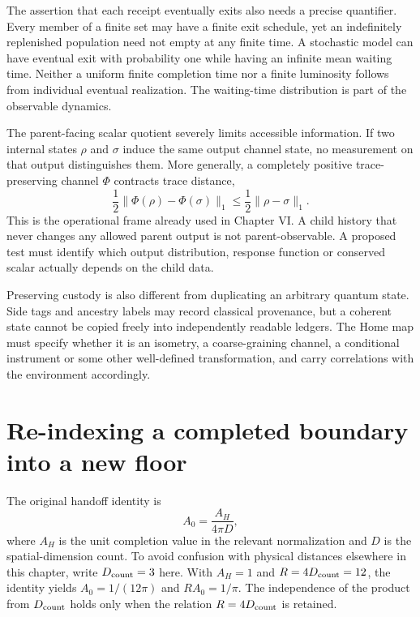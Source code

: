The assertion that each receipt eventually exits also needs a precise quantifier. Every member of a finite set may have a finite exit schedule, yet an indefinitely replenished population need not empty at any finite time. A stochastic model can have eventual exit with probability one while having an infinite mean waiting time. Neither a uniform finite completion time nor a finite luminosity follows from individual eventual realization. The waiting-time distribution is part of the observable dynamics.

The parent-facing scalar quotient severely limits accessible information. If two internal states $\rho$ and $\sigma$ induce the same output channel state, no measurement on that output distinguishes them. More generally, a completely positive trace-preserving channel $\Phi$ contracts trace distance,
\begin{equation}
 \frac12\|\Phi(\rho)-\Phi(\sigma)\|_1
 \leq\frac12\|\rho-\sigma\|_1.
 \label{c12:contraction}
\end{equation}
This is the operational frame already used in Chapter VI. A child history that never changes any allowed parent output is not parent-observable. A proposed test must identify which output distribution, response function or conserved scalar actually depends on the child data.

Preserving custody is also different from duplicating an arbitrary quantum state. Side tags and ancestry labels may record classical provenance, but a coherent state cannot be copied freely into independently readable ledgers. The Home map must specify whether it is an isometry, a coarse-graining channel, a conditional instrument or some other well-defined transformation, and carry correlations with the environment accordingly.

\section{Re-indexing a completed boundary into a new floor}
The original handoff identity is
\begin{equation}
 A_0=\frac{A_H}{4\pi D},
 \label{c12:handoff}
\end{equation}
where $A_H$ is the unit completion value in the relevant normalization and $D$ is the spatial-dimension count. To avoid confusion with physical distances elsewhere in this chapter, write $D_{\rm count}=3$ here. With $A_H=1$ and $R=4D_{\rm count}=12$, the identity yields $A_0=1/(12\pi)$ and $RA_0=1/\pi$. The independence of the product from $D_{\rm count}$ holds only when the relation $R=4D_{\rm count}$ is retained.

